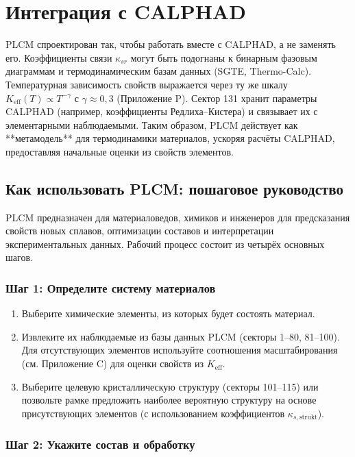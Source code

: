 \documentclass[12pt,a4paper]{article}
\newcommand{\Keff}{K_{\mathrm{eff}}}
\begin{document}
	\section{Интеграция с CALPHAD}
	
	PLCM спроектирован так, чтобы работать вместе с CALPHAD, а не заменять его. Коэффициенты связи \(\kappa_{sr}\) могут быть подогнаны к бинарным фазовым диаграммам и термодинамическим базам данных (SGTE, Thermo-Calc). Температурная зависимость свойств выражается через ту же шкалу \(\Keff(T) \propto T^{-\gamma}\) с \(\gamma \approx 0,3\) (Приложение P). Сектор 131 хранит параметры CALPHAD (например, коэффициенты Редлиха–Кистера) и связывает их с элементарными наблюдаемыми. Таким образом, PLCM действует как **метамодель** для термодинамики материалов, ускоряя расчёты CALPHAD, предоставляя начальные оценки из свойств элементов.
	
	\subsection{Как использовать PLCM: пошаговое руководство}
	
	PLCM предназначен для материаловедов, химиков и инженеров для предсказания свойств новых сплавов, оптимизации составов и интерпретации экспериментальных данных. Рабочий процесс состоит из четырёх основных шагов.
	
	\subsubsection{Шаг 1: Определите систему материалов}
	
	\begin{enumerate}
		\item Выберите химические элементы, из которых будет состоять материал.
		\item Извлеките их наблюдаемые из базы данных PLCM (секторы 1–80, 81–100). Для отсутствующих элементов используйте соотношения масштабирования (см. Приложение C) для оценки свойств из \(\Keff\).
		\item Выберите целевую кристаллическую структуру (секторы 101–115) или позвольте рамке предложить наиболее вероятную структуру на основе присутствующих элементов (с использованием коэффициентов \(\kappa_{s,\text{strukt}}\)).
	\end{enumerate}
	
	\subsubsection{Шаг 2: Укажите состав и обработку}
	
\end{document}
